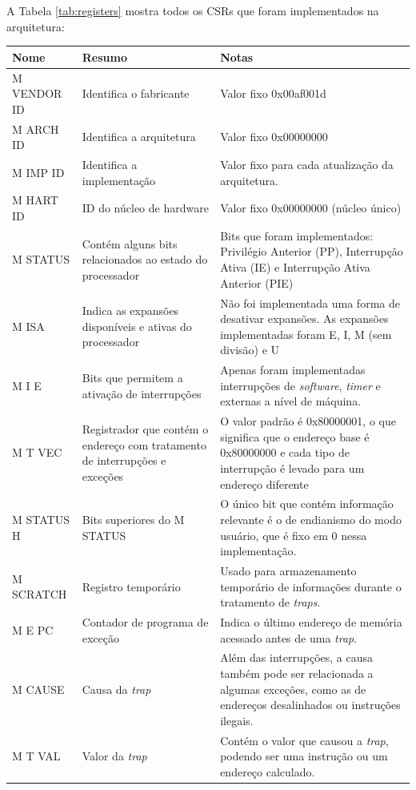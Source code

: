 \documentclass[
	12pt,				%
	openright,			%
	oneside,			%
	a4paper,			%
	english,			%
	french,				%
	spanish,			%
	brazil,				%
	]{abntex2}
\begin{document}
A Tabela \ref{tab:registers} mostra todos os CSRs que foram implementados na arquitetura:
{\fontsize{11}{13}\selectfont
\begin{longtable}{|p{3cm}|p{5cm}|p{8cm}|}
\hline  
\textbf{Nome} & \textbf{Resumo} & \textbf{Notas} \\ 
\hline  
M VENDOR ID & Identifica o fabricante & Valor fixo 0x00af001d \\ 
\hline  
M ARCH ID & Identifica a arquitetura & Valor fixo 0x00000000 \\ 
\hline  
M IMP ID & Identifica a implementação & Valor fixo para cada atualização da arquitetura. \\ 
\hline  
M HART ID & ID do núcleo de hardware & Valor fixo 0x00000000 (núcleo único) \\ 
\hline  
M STATUS & Contém alguns bits relacionados ao estado do processador & Bits que foram implementados: Privilégio Anterior (PP), Interrupção Ativa (IE) e Interrupção Ativa Anterior (PIE) \\ 
\hline  
M ISA & Indica as expansões disponíveis e ativas do processador & Não foi implementada uma forma de desativar expansões. As expansões implementadas foram E, I, M (sem divisão) e U \\ 
\hline  
M I E & Bits que permitem a ativação de interrupções & Apenas foram implementadas interrupções de \textit{software}, \textit{timer} e externas a nível de máquina. \\ 
\hline  
M T VEC & Registrador que contém o endereço com tratamento de interrupções e exceções & O valor padrão é 0x80000001, o que significa que o endereço base é 0x80000000 e cada tipo de interrupção é levado para um endereço diferente \\ 
\hline  
M STATUS H & Bits superiores do M STATUS & O único bit que contém informação relevante é o de endianismo do modo usuário, que é fixo em 0 nessa implementação. \\ 
\hline  
M SCRATCH & Registro temporário & Usado para armazenamento temporário de informações durante o tratamento de \textit{traps}. \\ 
\hline  
M E PC & Contador de programa de exceção & Indica o último endereço de memória acessado antes de uma \textit{trap}. \\ 
\hline  
M CAUSE & Causa da \textit{trap} & Além das interrupções, a causa também pode ser relacionada a algumas exceções, como as de endereços desalinhados ou instruções ilegais. \\ 
\hline  
M T VAL & Valor da \textit{trap} & Contém o valor que causou a \textit{trap}, podendo ser uma instrução ou um endereço calculado. \\ 

\end{longtable}}
\end{document}
